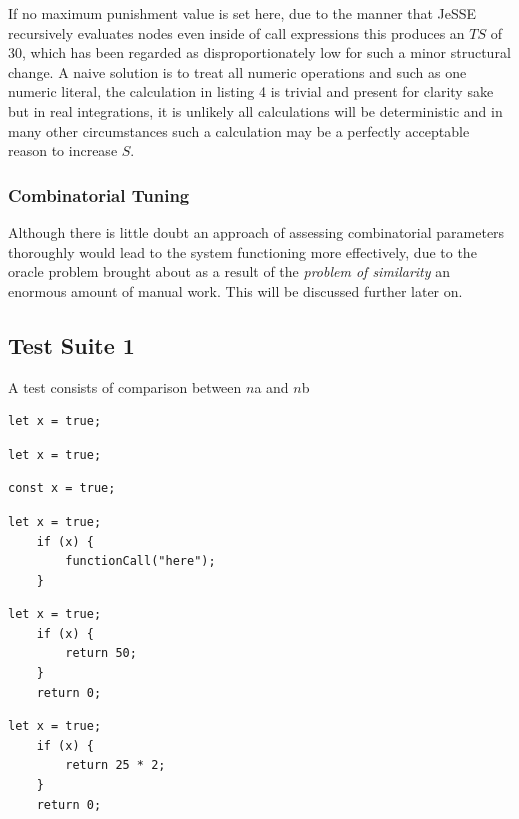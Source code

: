 \documentclass[jou,apacite]{apa6}
\begin{document}
If no maximum punishment value is set here, due to the manner that JeSSE recursively evaluates nodes even inside of call expressions this produces an $TS$ of 30, which has been regarded as disproportionately low for such a minor structural change. A naive solution is to treat all numeric operations and such as one numeric literal, the calculation in listing 4 is trivial and present for clarity sake but in real integrations, it is unlikely all calculations will be deterministic and in many other circumstances such a calculation may be a perfectly acceptable reason to increase $S$.

\subsubsection{Combinatorial Tuning}
Although there is little doubt an approach of assessing combinatorial parameters thoroughly  would lead to the system functioning more effectively, due to the oracle problem brought about as a result of the \textit{problem of similarity} an enormous amount of manual work. This will be discussed further later on.

\subsection{Test Suite 1}
A test consists of comparison between $n$a and $n$b
\begin{lstlisting}[caption=Comparison 1a \& 1b - Identical]
	let x = true;
\end{lstlisting}

\begin{lstlisting}[caption=Comparison 2a - Let against const]
	let x = true;
\end{lstlisting}
\begin{lstlisting}[caption=Comparison 2b - Let against const]
	const x = true;
\end{lstlisting}

\begin{lstlisting}[caption=Comparison 3a \& 3b - Identical extended]
	let x = true;
	if (x) {
		functionCall("here");
	}
\end{lstlisting}

\begin{lstlisting}[caption=Comparison 4a - Effect of numeric literal against numeric expression]
	let x = true;
	if (x) {
		return 50;
	}
	return 0;
\end{lstlisting}

\begin{lstlisting}[caption=Comparison 4b - Effect of numeric literal against numeric expression]
	let x = true;
	if (x) {
		return 25 * 2;
	}
	return 0;
\end{lstlisting}
\end{document}

